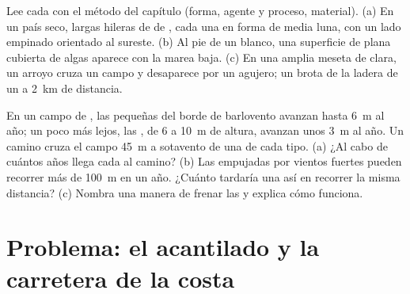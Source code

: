 \begin{exercise}[$\star\star\star$]\label{exo:g9:landforms:11}
Lee cada  con el método del capítulo (forma, agente y proceso,
material). (a) En un país seco, largas hileras de  de , cada
una en forma de media luna, con un lado empinado orientado al sureste.
(b) Al pie de un  blanco, una superficie de  plana cubierta
de algas aparece con la marea baja. (c) En una amplia meseta de 
clara, un arroyo cruza un campo y desaparece por un agujero; un 
brota de la ladera de un  a \qty{2}{km} de distancia.
\end{exercise}

\begin{exercise}[$\star\star\star$]\label{exo:g9:landforms:12}
En un campo de , las  pequeñas del borde de barlovento avanzan
hasta \qty{6}{m} al año; un poco más lejos, las , de 6 a \qty{10}{m}
de altura, avanzan unos \qty{3}{m} al año. Un camino cruza el campo
\qty{45}{m} a sotavento de una  de cada tipo. (a) ¿Al cabo de cuántos
años llega cada  al camino? (b) Las  empujadas por vientos
fuertes pueden recorrer más de \qty{100}{m} en un año. ¿Cuánto tardaría
una  así en recorrer la misma distancia? (c) Nombra una manera de
frenar las  y explica cómo funciona.
\end{exercise}

\section{Problema: el acantilado y la carretera de la costa}

